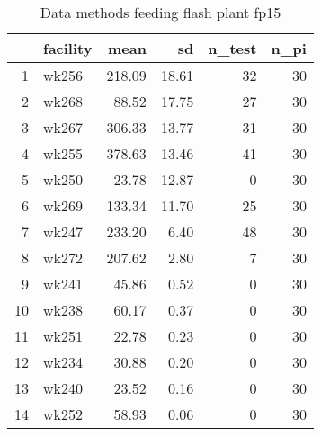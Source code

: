 \begin{table}[H]
\centering
\begin{tabular}{rlrrrr}
  \hline
 & facility & mean & sd & n\_test & n\_pi \\ 
  \hline
1 & wk256 & 218.09 & 18.61 &  32 &  30 \\ 
  2 & wk268 & 88.52 & 17.75 &  27 &  30 \\ 
  3 & wk267 & 306.33 & 13.77 &  31 &  30 \\ 
  4 & wk255 & 378.63 & 13.46 &  41 &  30 \\ 
  5 & wk250 & 23.78 & 12.87 &   0 &  30 \\ 
  6 & wk269 & 133.34 & 11.70 &  25 &  30 \\ 
  7 & wk247 & 233.20 & 6.40 &  48 &  30 \\ 
  8 & wk272 & 207.62 & 2.80 &   7 &  30 \\ 
  9 & wk241 & 45.86 & 0.52 &   0 &  30 \\ 
  10 & wk238 & 60.17 & 0.37 &   0 &  30 \\ 
  11 & wk251 & 22.78 & 0.23 &   0 &  30 \\ 
  12 & wk234 & 30.88 & 0.20 &   0 &  30 \\ 
  13 & wk240 & 23.52 & 0.16 &   0 &  30 \\ 
  14 & wk252 & 58.93 & 0.06 &   0 &  30 \\ 
   \hline
\end{tabular}
\caption{Data methods feeding flash plant fp15} 
\label{tab:well_summaries_fp15}
\end{table}
